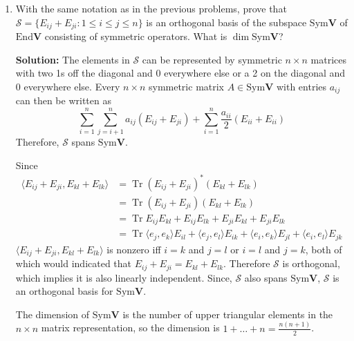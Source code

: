 \documentclass{report}
\newcommand{\solution}{\textbf{Solution: }}
\newcommand{\inner}[2]{\langle #1, #2 \rangle}
\begin{document}
\begin{enumerate}
	\medskip
	\item
	With the same notation as in the previous problems, prove that 
	$\mathcal{S} = \{ E_{ij} + E_{ji} \colon 1 \leq i \leq j \leq n\}$ is an orthogonal basis of the subspace
	$\mathrm{Sym}\mathbf{V}$ of $\mathrm{End}\mathbf{V}$ consisting of symmetric operators. 
	What is $\dim \mathrm{Sym}\mathbf{V}$?

	\solution 
   The elements in $\mathcal{S}$ can be represented by symmetric
   $n \times n$ matrices with two 1s off the diagonal and 0 everywhere else
   or a 2 on the diagonal and 0 everywhere else.
   Every $n \times n$ symmetric matrix $A \in \mathrm{Sym}\mathbf{V}$ with entries $a_{ij}$
   can then be written as 
   \[
	   \sum_{i=1}^n \sum_{j=i+1}^n a_{ij}(E_{ij}+E_{ji}) + \sum_{i=1}^n \frac{a_{ii}}{2} (E_{ii}+E_{ii})
   \]
   Therefore, $\mathcal{S}$ spans $\mathrm{Sym}\mathbf{V}$.
   
   Since
   \begin{align*}
	   \inner{E_{ij}+E_{ji}}{E_{kl}+E_{lk}} 
	   &= \operatorname{Tr} (E_{ij}+E_{ji})^* (E_{kl}+E_{lk}) \\
	   &= \operatorname{Tr} (E_{ij}+E_{ji}) (E_{kl}+E_{lk}) \\
	   &= \operatorname{Tr} E_{ij}E_{kl} + E_{ij}E_{lk} + E_{ji}E_{kl} + E_{ji}E_{lk} \\
	   &= \operatorname{Tr} \inner{e_j}{e_k}E_{il} + \inner{e_j}{e_l}E_{ik} +\inner{e_i}{e_k}E_{jl} + \inner{e_i}{e_l}E_{jk}
  \end{align*}
  $\inner{E_{ij}+E_{ji}}{E_{kl}+E_{lk}}$ is nonzero iff 
  $i=k$ and $j=l$ or $i=l$ and $j=k$, 
  both of which would indicated that $E_{ij}+E_{ji} = E_{kl}+E_{lk}$.
  Therefore $\mathcal{S}$ is orthogonal, which implies it is also linearly independent.
  Since, $\mathcal{S}$ also spans $\mathrm{Sym}\mathbf{V}$, 
  $\mathcal{S}$ is an orthogonal basis for $\mathrm{Sym}\mathbf{V}$.
  
  The dimension of $\mathrm{Sym} \mathbf{V}$ is 
  the number of upper triangular elements in the $n \times n$ matrix representation,
  so the dimension is $1 + \dots + n = \frac{n(n+1)}{2}$.
   
\end{enumerate}

\end{document}
